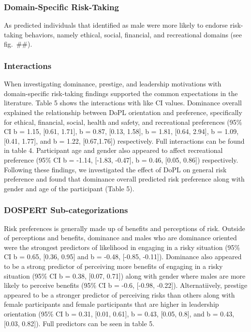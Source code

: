 \documentclass[
  donotrepeattitle,doc, 12pt, a4paper,floatsintext]{apa7}
\begin{document}
\hypertarget{domain-specific-risk-taking}{%
\subsubsection{Domain-Specific Risk-Taking}\label{domain-specific-risk-taking}}
As predicted individuals that identified as male were more likely to endorse risk-taking behaviors, namely ethical, social, financial, and recreational domains (see fig.~\#\#).
\hypertarget{interactions}{%
\subsubsection{Interactions}\label{interactions}}
When investigating dominance, prestige, and leadership motivations with domain-specific risk-taking findings supported the common expectations in the literature. Table 5 shows the interactions with like CI values. Dominance overall explained the relationship between DoPL orientation and preference, specifically for ethical, financial, social, health and safety, and recreational preferences (95\% CI b = 1.15, {[}0.61, 1.71{]}, b = 0.87, {[}0.13, 1.58{]}, b = 1.81, {[}0.64, 2.94{]}, b = 1.09, {[}0.41, 1.77{]}, and b = 1.22, {[}0.67,1.76{]}) respectively. Full interactions can be found in table 4. Participant age and gender also appeared to affect recreational preference (95\% CI b = -1.14, {[}-1.83, -0.47{]}, b = 0.46, {[}0.05, 0.86{]}) respectively.
Following these findings, we investigated the effect of DoPL on general risk preference and found that dominance overall predicted risk preference along with gender and age of the participant (Table 5).
\hypertarget{dospert-sub-categorizations}{%
\subsubsection{DOSPERT Sub-categorizations}\label{dospert-sub-categorizations}}
Risk preferences is generally made up of benefits and perceptions of risk. Outside of perceptions and benefits, dominance and males who are dominance oriented were the strongest predictors of likelihood in engaging in a risky situation (95\% CI b = 0.65, {[}0.36, 0.95{]} and b = -0.48, {[}-0.85, -0.11{]}). Dominance also appeared to be a strong predictor of perceiving more benefits of engaging in a risky situation (95\% CI b = 0.38, {[}0.07, 0.71{]}) along with gender where males are more likely to perceive benefits (95\% CI b = -0.6, {[}-0.98, -0.22{]}).
Alternatiively, prestige appeared to be a stronger predictor of perceiving risks than others along with female participants and female participants that are higher in leadership orientation (95\% CI b = 0.31, {[}0.01, 0.61{]}, b = 0.43, {[}0.05, 0.8{]}, and b = 0.43, {[}0.03, 0.82{]}). Full predictors can be seen in table 5.
\end{document}

